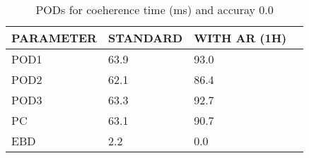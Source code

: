 \begin{table}[]
\begin{center}
\begin{tabular}{|l|l|l|l|}
\hline
\multicolumn{1}{|c|}{\cellcolor[HTML]{C0C0C0}\textbf{PARAMETER}} & \multicolumn{1}{c|}{\cellcolor[HTML]{C0C0C0}\textbf{STANDARD}} & \multicolumn{1}{c|}{\cellcolor[HTML]{C0C0C0}\textbf{WITH AR (1H)}} \\
\hline
\cellcolor[HTML]{C0C0C0}POD1  & 63.9                                & 93.0         \\
\cellcolor[HTML]{C0C0C0}POD2  & 62.1                                & 86.4         \\
\cellcolor[HTML]{C0C0C0}POD3  & 63.3                                & 92.7         \\
\cellcolor[HTML]{C0C0C0}PC    & 63.1                                  & 90.7           \\
\cellcolor[HTML]{C0C0C0}EBD   & 2.2                                 & 0.0          \\
\hline
\end{tabular}
\caption{PODs for coeherence time (ms) and accuray 0.0}
\end{center}
\end{table}
